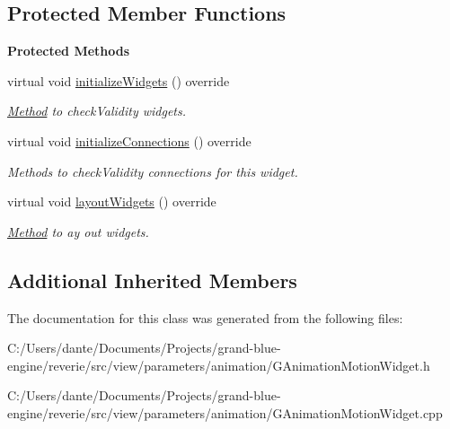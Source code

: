 \subsection*{Protected Member Functions}
\begin{Indent}\textbf{ Protected Methods}\par
\begin{DoxyCompactItemize}
\item 
\mbox{\label{classrev_1_1_view_1_1_anim_motion_widget_a8461ed0e0fc81a05e1b9ac0a88de4d2f}} 
virtual void \mbox{\hyperlink{classrev_1_1_view_1_1_anim_motion_widget_a8461ed0e0fc81a05e1b9ac0a88de4d2f}{initialize\+Widgets}} () override
\begin{DoxyCompactList}\small\item\em \mbox{\hyperlink{struct_method}{Method}} to check\+Validity widgets. \end{DoxyCompactList}\item 
\mbox{\label{classrev_1_1_view_1_1_anim_motion_widget_a9c1f00e8ce5d817ff7acf5eac40c7422}} 
virtual void \mbox{\hyperlink{classrev_1_1_view_1_1_anim_motion_widget_a9c1f00e8ce5d817ff7acf5eac40c7422}{initialize\+Connections}} () override
\begin{DoxyCompactList}\small\item\em Methods to check\+Validity connections for this widget. \end{DoxyCompactList}\item 
\mbox{\label{classrev_1_1_view_1_1_anim_motion_widget_a9237f141db1a1d5a5877ae34daeafeb7}} 
virtual void \mbox{\hyperlink{classrev_1_1_view_1_1_anim_motion_widget_a9237f141db1a1d5a5877ae34daeafeb7}{layout\+Widgets}} () override
\begin{DoxyCompactList}\small\item\em \mbox{\hyperlink{struct_method}{Method}} to ay out widgets. \end{DoxyCompactList}\end{DoxyCompactItemize}
\end{Indent}
\subsection*{Additional Inherited Members}


The documentation for this class was generated from the following files\+:\begin{DoxyCompactItemize}
\item 
C\+:/\+Users/dante/\+Documents/\+Projects/grand-\/blue-\/engine/reverie/src/view/parameters/animation/G\+Animation\+Motion\+Widget.\+h\item 
C\+:/\+Users/dante/\+Documents/\+Projects/grand-\/blue-\/engine/reverie/src/view/parameters/animation/G\+Animation\+Motion\+Widget.\+cpp\end{DoxyCompactItemize}
